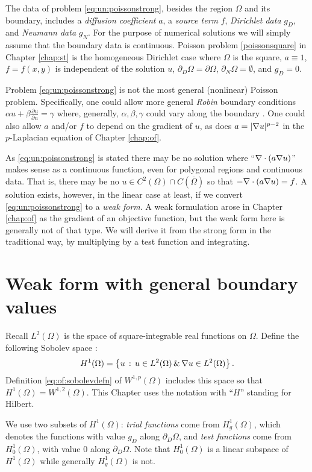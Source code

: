 The data of problem \eqref{eq:un:poissonstrong}, besides the region $\Omega$ and its boundary, includes a \emph{diffusion coefficient} $a$, a \emph{source term} $f$, \emph{Dirichlet data} $g_D$, and \emph{Neumann data} $g_N$.  For the purpose of numerical solutions we will simply assume that the boundary data is continuous.  Poisson problem \eqref{poissonsquare} in Chapter \ref{chap:st} is the homogeneous Dirichlet case where $\Omega$ is the square, $a\equiv 1$, $f=f(x,y)$ is independent of the solution $u$, $\partial_D \Omega = \partial \Omega$, $\partial_N \Omega = \emptyset$, and $g_D=0$.

Problem \eqref{eq:un:poissonstrong} is not the most general (nonlinear) Poisson problem.  Specifically, one could allow more general \emph{Robin} boundary conditions $\alpha u + \beta \frac{\partial u}{\partial n} = \gamma$ where, generally, $\alpha,\beta,\gamma$ could vary along the boundary \citep{Elmanetal2005}.  One could also allow $a$ and/or $f$ to depend on the gradient of $u$, as does $a=|\nabla u|^{p-2}$ in the $p$-Laplacian equation of Chapter \ref{chap:of}.

As \eqref{eq:un:poissonstrong} is stated there may be no solution where ``$\nabla\cdot(a\nabla u)$'' makes sense as a continuous function, even for polygonal regions and continuous data.  That is, there may be no $u\in C^2(\Omega) \cap C(\overline \Omega)$ so that $-\nabla\cdot(a\nabla u) = f$.  A solution exists, however, in the linear case at least, if we convert \eqref{eq:un:poissonstrong} to a \emph{weak form}.  A weak formulation arose in Chapter \ref{chap:of} as the gradient of an objective function, but the weak form here is generally not of that type.  We will derive it from the strong form in the traditional way, by multiplying by a test function and integrating.


\section{Weak form with general boundary values}

Recall $L^2(\Omega)$ is the space of square-integrable real functions on $\Omega$.  Define the following Sobolev space \citep{Evans2010}:
    $$H^1(\Omega) = \left\{u \,:\, u \in L^2(\Omega) \,\&\, \nabla u \in L^2(\Omega)\right\}.$$
Definition \eqref{eq:of:sobolevdefn} of $W^{1,p}(\Omega)$ includes this space so that $H^1(\Omega) = W^{1,2}(\Omega)$.  This Chapter uses the notation with ``$H$'' standing for Hilbert.

We use two subsets of $H^1(\Omega)$: \emph{trial functions} come from $H_{g}^1(\Omega)$, which denotes the functions with value $g_D$ along $\partial_D \Omega$, and \emph{test functions} come from $H_{0}^1(\Omega)$, with value $0$ along $\partial_D \Omega$.  Note that $H_{0}^1(\Omega)$ is a linear subspace of $H^1(\Omega)$ while generally $H_{g}^1(\Omega)$ is not.

